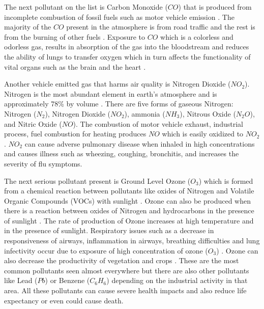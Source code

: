\par
The next pollutant on the list is Carbon Monoxide ($CO$) that is produced from incomplete combustion of fossil fuels such as motor vehicle emission \cite{Payus2019}. The majority of the $CO$ present in the atmosphere is from road traffic and the rest is from the burning of other fuels \cite{Payus2019}. Exposure to $CO$  which is a colorless and odorless gas, results in absorption of the gas into the bloodstream and reduces the ability of lungs to transfer oxygen which in turn affects the functionality of vital organs such as the brain and the heart \cite{Sierra-vargas2012} \cite{Golbabaei2012}.

Another vehicle emitted gas that harms air quality is Nitrogen Dioxide ($NO_2$). Nitrogen is the most abundant element in earth's atmosphere and is approximately 78\% by volume \cite{EnvironmentalQualitySectionMoE2012}. There are five forms of gaseous Nitrogen: Nitrogen (${N_2}$), Nitrogen Dioxide ($NO_2$), ammonia ($NH_3$), Nitrous Oxide ($N_2O$), and Nitric Oxide ($NO$). The combustion of motor vehicle exhaust, industrial process, fuel combustion for heating produces $NO$ which is easily oxidized to $NO_2$ \cite{EnvironmentalQualitySectionMoE2012}. $NO_2$ can cause adverse pulmonary disease when inhaled in high concentrations and causes illness such as wheezing, coughing, bronchitis, and increases the severity of flu symptoms\cite{Salonen2019}. 

The next serious pollutant present is Ground Level Ozone ($O_3$) which is formed from a chemical reaction between pollutants like oxides of Nitrogen and Volatile Organic Compounds (VOCs) with sunlight \cite{EPA2018}. Ozone can also be produced when there is a reaction between oxides of Nitrogen and hydrocarbons in the presence of sunlight \cite{Environment2016}.  The rate of production of Ozone increases at high temperature and in the presence of sunlight. Respiratory issues such as a decrease in responsiveness of airways, inflammation in airways, breathing difficulties and lung infectivity occur due to exposure of high concentration of ozone ($O_3$) \cite{Lippmann1989}. Ozone can also decrease the productivity of vegetation and crops \cite{cukor2015bridging}. These are the most common pollutants seen almost everywhere but there are also other pollutants like Lead ($Pb$) or Benzene ($C_{6}H_{6}$) depending on the industrial activity in that area. All these pollutants can cause severe health impacts and also reduce life expectancy or even could cause death.

